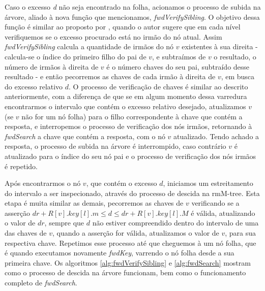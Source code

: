 Caso o excesso \textit{d} não seja encontrado na folha, acionamos o processo de subida na árvore, aliado à nova função que mencionamos, \textit{fwdVerifySibling}.
O objetivo dessa função é similar ao proposto por \citet{book-compact-data-structures}, quando o autor sugere que em cada nível verifiquemos se o excesso procurado está no irmão do nó atual.
Assim \textit{fwdVerifySibling} calcula a quantidade de irmãos do nó $v$ existentes à sua direita - calcula-se o índice do primeiro filho do pai de $v$, e subtraímos de $v$ o resultado, o número de irmãos 
à direita de $v$ é o número chaves do seu pai, subtraído desse resultado - e então 
pecorremos as chaves de cada irmão à direita de $v$, em busca do excesso relativo $d$. O processo de verificação de chaves é similar ao descrito anteriormente, com a diferença de que
se em algum momento dessa varredura encontrarmos o intervalo que contém o excesso relativo desejado, atualizamos $v$ (se $v$ não for um nó folha) para o filho correspondente
à chave que contém a resposta, e interropemos o processo de verificação dos nós irmãos, retornando à \textit{fwdSearch} a chave que contém a resposta, com o nó $v$
atualizado. Tendo achado a resposta, o processo de subida na árvore é interrompido, caso contrário $v$ é atualizado para o índice do seu nó pai e o processo de verificação dos nós irmãos
é repetido.

Após encontrarmos o nó $v$, que contém o excesso  $d$, iniciamos  um estreitamento do intervalo a ser inspecionado, através do processo de descida na
rmM-tree. Esta etapa é muita similar as demais, pecorremos as chaves de $v$ verificando se a asserção $dr + R[v].key[l].m \leq d \leq dr + R[v].key[l].M$ é válida,
atualizando o valor de $dr$, sempre que $d$ não estiver compreendido dentro do intervalo de uma das chaves de $v$, quando a asserção for válida, atualizamos o valor de $v$,
para sua respectiva chave. Repetimos esse processo até que cheguemos à um nó folha, que é quando executamos novamente \textit{fwdKey}, varrendo o nó folha desde a sua primeira chave.
Os algoritmos \ref{alg:fwdVerifySibling} e \ref{alg:fwdSearch} mostram como o processo de descida na árvore funcionam, bem como o funcionamento completo de \textit{fwdSearch}.

